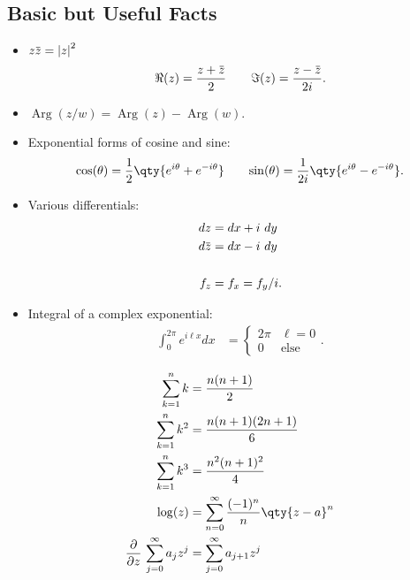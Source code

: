 \hypertarget{basic-but-useful-facts}{%
\subsection{Basic but Useful Facts}\label{basic-but-useful-facts}}

\begin{fact}

\envlist

\begin{itemize}
\item
  \(z\mkern 1.5mu\overline{\mkern-1.5muz\mkern-1.5mu}\mkern 1.5mu = {\left\lvert {z} \right\rvert}^2\)
  \begin{align*}
  \Re(z) = { z + \mkern 1.5mu\overline{\mkern-1.5muz\mkern-1.5mu}\mkern 1.5mu \over 2} && && 
  \Im(z) = {z - \mkern 1.5mu\overline{\mkern-1.5muz\mkern-1.5mu}\mkern 1.5mu \over 2i}
  .\end{align*}
\item
  \(\operatorname{Arg}(z/w) = \operatorname{Arg}(z) - \operatorname{Arg}(w)\).
\item
  Exponential forms of cosine and sine:
  \begin{align*}
  \cos(\theta) = \frac 1 2 \qty{e^{i\theta} + e^{-i\theta}} && &&
  \sin(\theta) = \frac{1}{2i}\qty{e^{i\theta} - e^{-i\theta}}
  .\end{align*}
\item
  Various differentials:
  \begin{align*}
  dz &= dx + i~dy \\
  d\mkern 1.5mu\overline{\mkern-1.5muz\mkern-1.5mu}\mkern 1.5mu &= dx - i~dy \\ \\
  f_z &= f_x = f_y / i
  .\end{align*}
\item
  Integral of a complex exponential:
  \begin{align*}
  \int_{0}^{2 \pi} e^{i \ell x} d x
  &=\left\{\begin{array}{ll}
  {2 \pi} & {\ell=0} \\ 
  {0} & \text{else}
  \end{array}\right.
  .\end{align*}
\end{itemize}

\end{fact}

\begin{fact}

\begin{align*}
\sum_{k=1}^{n} k &=\frac{n(n+1)}{2} \\
\sum_{k=1}^{n} k^{2} &=\frac{n(n+1)(2 n+1)}{6} \\
\sum_{k=1}^{n} k^{3} &=\frac{n^{2}(n+1)^{2}}{4}  \\
\log(z) &= \sum_{n=0}^\infty { (-1)^n \over n} \qty{z-a}^n \\
{\frac{\partial }{\partial z}\,} \sum_{j=0}^\infty a_j z^j &= \sum_{j=0}^\infty a_{j+1}z^j
\end{align*}

\end{fact}

